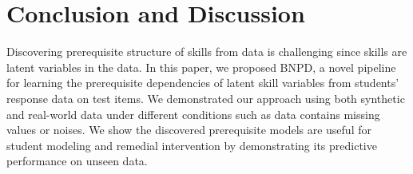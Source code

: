 \documentclass{edm_template}
\begin{document}
{	
	\section{Conclusion and Discussion \label{sec:conclusion}}
	Discovering prerequisite structure of skills from data is challenging since skills are latent variables in the data.
	In this paper, we proposed BNPD, a novel pipeline for learning the prerequisite dependencies of latent skill variables from students' response data on test items.
	We demonstrated our approach using both synthetic and real-world data under different conditions such as data contains missing values or noises.
	We show the discovered prerequisite models are useful for student modeling and remedial intervention by demonstrating its predictive performance on unseen data.
	
	
}
\end{document}
